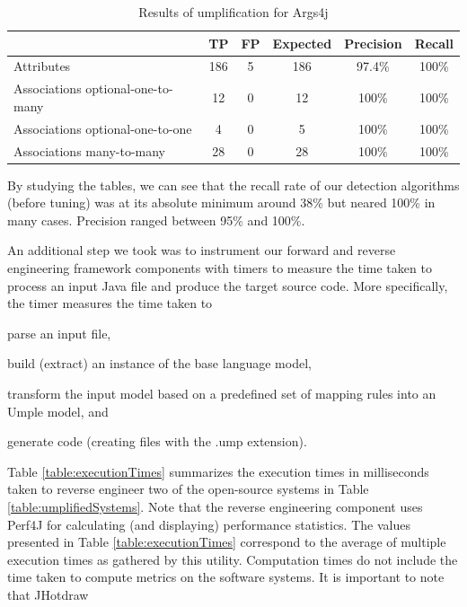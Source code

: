\begin{table}[h]
\caption{Results of umplification for Args4j}
\label{table:umplifiedResultsSystems7}
\begin{tabularx}{\textwidth}{l|ccccc}
\toprule
\rowcolor[HTML]{BBDAFF}
\textbf{} & \textbf{TP}  & \textbf{FP} & \textbf{Expected}  & \textbf{Precision}  & \textbf{Recall}\\ \hline
Attributes & 186 & 5 & 186 & 97.4\% & 100\%  \\ \hline
Associations optional-one-to-many &  12 & 0 & 12 & 100\% & 100\%\\
Associations optional-one-to-one &  4 & 0 & 5  & 100\% & 100\% \\ 
Associations many-to-many & 28 & 0 & 28 & 100\% & 100\% \\ 
\end{tabularx}
\end{table}

By studying the tables, we can see that the recall rate of our detection algorithms (before tuning) was at its absolute minimum around 38\% but neared 100\% in many cases. Precision ranged between 95\% and 100\%.

An additional step we took was to instrument our forward and reverse engineering framework components with timers to measure the time taken to process an input Java file and produce the target source code. More specifically, the timer measures the time taken to 
\begin{enumerate*}
\item parse an input file,  \item build (extract) an instance of the base language model,   \item  transform the input model based on a predefined set of mapping rules into an Umple model, and \item generate code  (creating files with the .ump extension).
\end{enumerate*}

Table \ref{table:executionTimes} summarizes the execution times in milliseconds taken to reverse engineer two of the open-source systems in Table \ref{table:umplifiedSystems}. Note that the reverse engineering component uses Perf4J \cite{Perf4j} for calculating (and displaying) performance statistics. The values presented in Table \ref{table:executionTimes} correspond to the average of multiple execution times as gathered by this utility. Computation times do not include the time taken to compute metrics on the software systems. It is important to note that JHotdraw 


